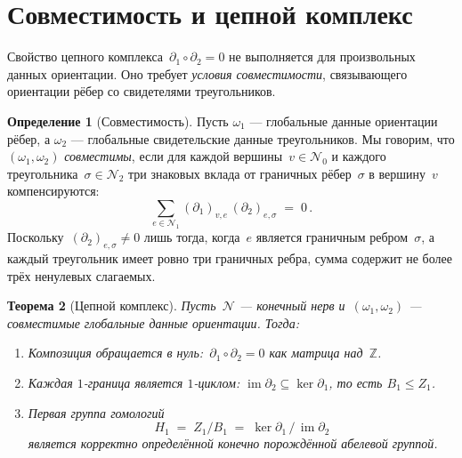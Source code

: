 \documentclass[11pt,a4paper]{article}
\theoremstyle{plain}
\newtheorem{theorem}{Теорема}[section]
\theoremstyle{definition}
\newtheorem{definition}[theorem]{Определение}
\theoremstyle{remark}
\newcommand{\ZZ}{\mathbb{Z}}
\newcommand{\cN}{\mathcal{N}}
\begin{document}
\section{Совместимость и цепной комплекс}
\label{sec:chain-complex}

Свойство цепного комплекса~$\partial_1 \circ \partial_2 = 0$ не
выполняется для произвольных данных ориентации. Оно требует \emph{условия
совместимости}, связывающего ориентации рёбер со свидетелями
треугольников.

\begin{definition}[Совместимость]
\label{def:compatibility}
Пусть $\omega_1$ --- глобальные данные ориентации рёбер, а $\omega_2$ ---
глобальные свидетельские данные треугольников. Мы говорим, что
$(\omega_1, \omega_2)$ \emph{совместимы}, если для каждой
вершины~$v \in \cN_0$ и каждого треугольника~$\sigma \in \cN_2$
три знаковых вклада от граничных рёбер~$\sigma$ в вершину~$v$
компенсируются:
\begin{equation}
  \label{eq:composition-entry}
  \sum_{e \in \cN_1} (\partial_1)_{v, e}\, (\partial_2)_{e, \sigma}
  \;=\; 0\,.
\end{equation}
Поскольку~$(\partial_2)_{e,\sigma} \neq 0$ лишь тогда, когда~$e$ является
граничным ребром~$\sigma$, а каждый треугольник имеет ровно три граничных
ребра, сумма содержит не более трёх ненулевых слагаемых.
\end{definition}

\begin{theorem}[Цепной комплекс]
\label{thm:chain-complex}
Пусть~$\cN$ --- конечный нерв и~$(\omega_1, \omega_2)$ --- совместимые
глобальные данные ориентации. Тогда:
\begin{enumerate}[label=\textup{(\roman*)},nosep]
  \item Композиция обращается в нуль:~$\partial_1 \circ \partial_2 = 0$
        как матрица над~$\ZZ$.
  \item Каждая $1$-граница является $1$-циклом: $\operatorname{im} \partial_2
        \subseteq \ker \partial_1$, то есть $B_1 \leq Z_1$.
  \item Первая группа гомологий
        \[
          H_1 \;=\; Z_1 / B_1
          \;=\; \ker \partial_1 \,/\, \operatorname{im} \partial_2
        \]
        является корректно определённой конечно порождённой абелевой группой.
\end{enumerate}
\end{theorem}
\end{document}
